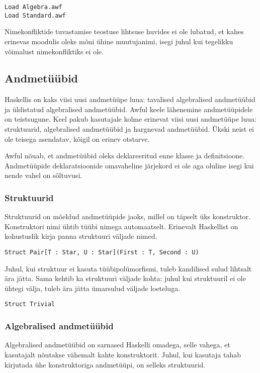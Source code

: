 \documentclass[12pt]{article}
\begin{document}
      \begin{verbatim}Load Algebra.awf
Load Standard.awf\end{verbatim}

      Nimekonfliktide tuvastamise teostuse lihtsuse huvides ei ole lubatud, et kahes erinevas moodulis oleks mõni ühine muutujanimi, isegi juhul kui tegelikku võimalust nimekonfliktiks ei ole.
    \subsection{Andmetüübid}
      Haskellis on kaks viisi uusi andmetüüpe luua: tavalised algebralised andmetüübid ja üldistatud algebralised andmetüübid. Awful keele lähenemine andmetüüpidele on teistsugune. Keel pakub kasutajale kolme erinevat viisi uusi andmetüüpe luua: struktuurid, algebralised andmetüübid ja hargnevad andmetüübid. Ükski neist ei ole teisega asendatav, kõigil on erinev otstarve.

      Awful nõuab, et andmetüübid oleks deklareeritud enne klasse ja definitsioone. Andmetüüpide deklaratsioonide omavaheline järjekord ei ole aga oluline isegi kui nende vahel on sõltuvusi.
      \subsubsection{Struktuurid}
        Struktuurid on mõeldud andmetüüpide jaoks, millel on täpselt üks konstruktor. Konstruktori nimi ühtib tüübi nimega automaatselt. Erinevalt Haskellist on kohustuslik kirja panna struktuuri väljade nimed.

        \begin{verbatim}Struct Pair[T : Star, U : Star](First : T, Second : U)\end{verbatim}

        Juhul, kui struktuur ei kasuta tüübipolümorfismi, tuleb kandilised sulud lihtsalt ära jätta. Sama kehtib ka struktuuri väljade kohta: juhul kui struktuuril ei ole ühtegi välja, tuleb ära jätta ümarsulud väljade loeteluga.

        \begin{verbatim}Struct Trivial\end{verbatim}

      \subsubsection{Algebralised andmetüübid}
        Algebralised andmetüübid on sarnased Haskelli omadega, selle vahega, et kasutajalt nõutakse vähemalt kahte konstruktorit. Juhul, kui kasutaja tahab kirjutada ühe konstruktoriga andmetüüpi, on selleks struktuurid.
\end{document}
